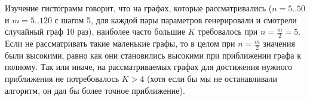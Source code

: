 \begin{figure}
\centering
{}
\qquad
{}
\qquad
{}
\qquad
{}
\caption{}
\end{figure}

Изучение гистограмм говорит, что на графах, которые рассматривались ($n=5..50$ и $m=5..120$ с шагом 5, для каждой пары параметров генерировали и смотрели случайный граф 10 раз), наиболее часто большие $K$ требовалось при $n = \frac{m}{2} = 5$. Если не рассматривать такие маленькие графы, то в целом при $n=\frac{m}{2}$ значения были высокими, равно как они становились высокими при приближении графа к полному. Так или иначе, на рассматриваемых графах для достижения нужного приближения не потребовалось $K > 4$ (хотя если бы мы не останавливали алгоритм, он дал бы более точное приближение).

